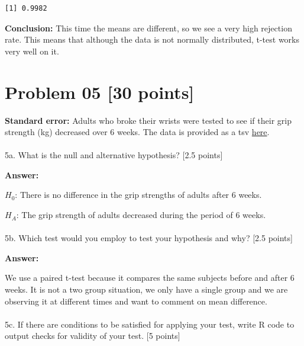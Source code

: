 \documentclass[
  letterpaper,
  DIV=11,
  numbers=noendperiod]{scrartcl}
\makeatletter
\let\oldparagraph\paragraph
\renewcommand{\paragraph}{
    \@ifstar
      \xxxParagraphStar
      \xxxParagraphNoStar
  }
\newcommand{\xxxParagraphStar}[1]{\oldparagraph*{#1}\mbox{}}
\newcommand{\xxxParagraphNoStar}[1]{\oldparagraph{#1}\mbox{}}
\makeatother
\begin{document}
\begin{verbatim}
[1] 0.9982
\end{verbatim}

\textbf{Conclusion:} This time the means are different, so we see a very
high rejection rate. This means that although the data is not normally
distributed, t-test works very well on it.

\section{Problem 05 {[}30 points{]}}\label{problem-05-30-points}

\textbf{Standard error:} Adults who broke their wrists were tested to
see if their grip strength (kg) decreased over 6 weeks. The data is
provided as a tsv
\href{https://drive.google.com/file/d/1HfzOESwZBuqNgEHX18Dfd4I7vTSwQOPh/view?usp=sharing}{here}.

\paragraph{5a. What is the null and alternative hypothesis? {[}2.5
points{]}}\label{a.-what-is-the-null-and-alternative-hypothesis-2.5-points}

\textbf{Answer:}

\(H_0\): There is no difference in the grip strengths of adults after 6
weeks.

\(H_A\): The grip strength of adults decreased during the period of 6
weeks.

\paragraph{5b. Which test would you employ to test your hypothesis and
why? {[}2.5
points{]}}\label{b.-which-test-would-you-employ-to-test-your-hypothesis-and-why-2.5-points}

\textbf{Answer:}

We use a paired t-test because it compares the same subjects before and
after 6 weeks. It is not a two group situation, we only have a single
group and we are observing it at different times and want to comment on
mean difference.

\paragraph{5c. If there are conditions to be satisfied for applying your
test, write R code to output checks for validity of your test. {[}5
points{]}}\label{c.-if-there-are-conditions-to-be-satisfied-for-applying-your-test-write-r-code-to-output-checks-for-validity-of-your-test.-5-points}
\end{document}
